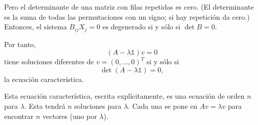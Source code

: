 \documentclass[11pt,a4paper]{article}
\newcommand{\concept}[1]{\textcolor{concept-green}{#1}}
\begin{document}
Pero el determinante de una matriz con filas repetidas es cero. (El determinante es la suma de todas las permutaciones con un signo; si hay repetición da cero.) Entonces, el sistema $B_{ij}X_j=0$ es degenerado si y sólo si $\det B=0$.

Por tanto,
\[
  (A-\lambda\mathbb{1})v=0
\]
tiene soluciones diferentes de $v=(0,\ldots,0)^T$ si y sólo si
\[
  \det(A-\lambda\mathbb{1})=0,
\]
la \concept{ecuación característica}.

Esta ecuación característica, escrita explícitamente, es una ecuación de orden $n$ para $\lambda$. Esta tendrá $n$ soluciones para $\lambda$. Cada una se pone en $Av=\lambda v$ para encontrar $n$ vectores (uno por $\lambda$).
\end{document}
